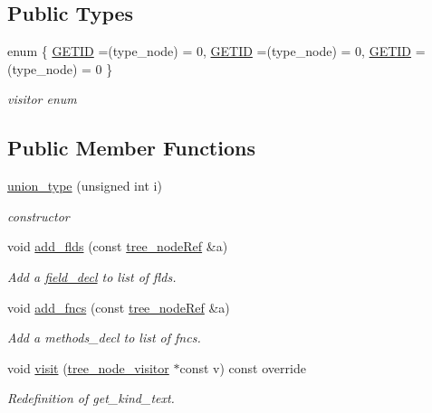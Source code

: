 \subsection*{Public Types}
\begin{DoxyCompactItemize}
\item 
enum \{ \hyperlink{structunion__type_ae554d89717db90668c5a0ec40569eb58ac95274bcbf3f58c72395649f8d568dbe}{G\+E\+T\+ID} =(type\+\_\+node) = 0, 
\hyperlink{structunion__type_ae554d89717db90668c5a0ec40569eb58ac95274bcbf3f58c72395649f8d568dbe}{G\+E\+T\+ID} =(type\+\_\+node) = 0, 
\hyperlink{structunion__type_ae554d89717db90668c5a0ec40569eb58ac95274bcbf3f58c72395649f8d568dbe}{G\+E\+T\+ID} =(type\+\_\+node) = 0
 \}\begin{DoxyCompactList}\small\item\em visitor enum \end{DoxyCompactList}
\end{DoxyCompactItemize}
\subsection*{Public Member Functions}
\begin{DoxyCompactItemize}
\item 
\hyperlink{structunion__type_ac7720bcb1a0e063e704342af897c4f10}{union\+\_\+type} (unsigned int i)
\begin{DoxyCompactList}\small\item\em constructor \end{DoxyCompactList}\item 
void \hyperlink{structunion__type_ad1f0a0b9dd809ab340974e1fcc037622}{add\+\_\+flds} (const \hyperlink{tree__node_8hpp_a6ee377554d1c4871ad66a337eaa67fd5}{tree\+\_\+node\+Ref} \&a)
\begin{DoxyCompactList}\small\item\em Add a \hyperlink{structfield__decl}{field\+\_\+decl} to list of flds. \end{DoxyCompactList}\item 
void \hyperlink{structunion__type_a08c315ad1921885f58031b3fb26579cc}{add\+\_\+fncs} (const \hyperlink{tree__node_8hpp_a6ee377554d1c4871ad66a337eaa67fd5}{tree\+\_\+node\+Ref} \&a)
\begin{DoxyCompactList}\small\item\em Add a methods\+\_\+decl to list of fncs. \end{DoxyCompactList}\item 
void \hyperlink{structunion__type_a6a6db754840c90dd94a29478df279e7b}{visit} (\hyperlink{classtree__node__visitor}{tree\+\_\+node\+\_\+visitor} $\ast$const v) const override
\begin{DoxyCompactList}\small\item\em Redefinition of get\+\_\+kind\+\_\+text. \end{DoxyCompactList}\end{DoxyCompactItemize}
